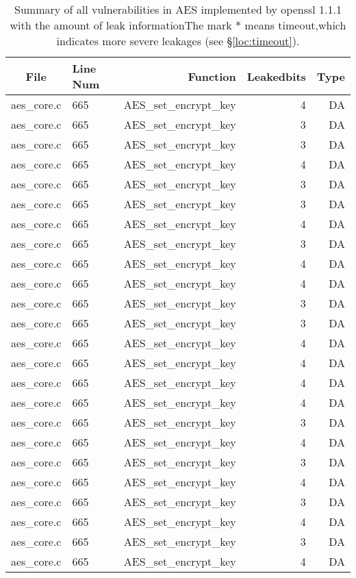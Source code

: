 \begin{table*}%
\centering
\caption{Summary of all vulnerabilities in AES implemented by openssl 1.1.1 with the amount of leak informationThe mark $*$ means timeout,which indicates more severe leakages (see \S\ref{loc:timeout}).}\label{tab:AESopenssl}
\begin{tabular}{clrrr}
\hline
\textbf{File} & \textbf{Line Num} & \textbf{Function} & \textbf{Leakedbits} & \textbf{Type} \\\hline
aes\_core.c&665&AES\_set\_encrypt\_key&4 &DA\\
aes\_core.c&665&AES\_set\_encrypt\_key&3 &DA\\
aes\_core.c&665&AES\_set\_encrypt\_key&3 &DA\\
aes\_core.c&665&AES\_set\_encrypt\_key&4 &DA\\
aes\_core.c&665&AES\_set\_encrypt\_key&3 &DA\\
aes\_core.c&665&AES\_set\_encrypt\_key&3 &DA\\
aes\_core.c&665&AES\_set\_encrypt\_key&4 &DA\\
aes\_core.c&665&AES\_set\_encrypt\_key&3 &DA\\
aes\_core.c&665&AES\_set\_encrypt\_key&4 &DA\\
aes\_core.c&665&AES\_set\_encrypt\_key&4 &DA\\
aes\_core.c&665&AES\_set\_encrypt\_key&3 &DA\\
aes\_core.c&665&AES\_set\_encrypt\_key&3 &DA\\
aes\_core.c&665&AES\_set\_encrypt\_key&4 &DA\\
aes\_core.c&665&AES\_set\_encrypt\_key&4 &DA\\
aes\_core.c&665&AES\_set\_encrypt\_key&4 &DA\\
aes\_core.c&665&AES\_set\_encrypt\_key&4 &DA\\
aes\_core.c&665&AES\_set\_encrypt\_key&3 &DA\\
aes\_core.c&665&AES\_set\_encrypt\_key&4 &DA\\
aes\_core.c&665&AES\_set\_encrypt\_key&3 &DA\\
aes\_core.c&665&AES\_set\_encrypt\_key&4 &DA\\
aes\_core.c&665&AES\_set\_encrypt\_key&3 &DA\\
aes\_core.c&665&AES\_set\_encrypt\_key&4 &DA\\
aes\_core.c&665&AES\_set\_encrypt\_key&3 &DA\\
aes\_core.c&665&AES\_set\_encrypt\_key&4 &DA\\

\end{tabular}
\end{table*}
